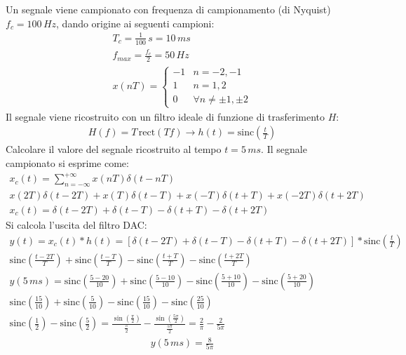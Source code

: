 \documentclass{article}
\newcommand{\rect}{\mathrm{rect}}
\newcommand{\sinc}{\mathrm{sinc}}
\begin{document}
Un segnale viene campionato con frequenza di campionamento (di Nyquist) $f_c=100\,Hz$, dando origine ai seguenti campioni:
\begin{gather*}
    T_c=\displaystyle\frac{1}{100}\,s=10\,ms\\
    f_{max}=\frac{f_c}{2}=50\,Hz\\
    x(nT)=\begin{cases}
        -1&n=-2,-1\\
        1&n=1,2\\
        0&\forall n\neq\pm1,\pm2
    \end{cases}
\end{gather*}
Il segnale viene ricostruito con un filtro ideale di funzione di trasferimento $H$:
\begin{gather*}
    H(f)=T\,\rect(Tf)\to  h(t)=\sinc\left(\frac{t}{T}\right)
\end{gather*} 
Calcolare il valore del segnale ricostruito al tempo $t=5\,ms$. Il segnale campionato si esprime come:
\begin{gather*}
    x_c(t)=\displaystyle\sum_{n=-\infty}^{+\infty}x(nT)\delta(t-nT)\\
    x(2T)\delta(t-2T)+x(T)\delta(t-T)+x(-T)\delta(t+T)+x(-2T)\delta(t+2T)\\
    x_c(t)=\delta(t-2T)+\delta(t-T)-\delta(t+T)-\delta(t+2T)
\end{gather*}
Si calcola l'uscita del filtro DAC:
\begin{gather*}
    y(t)=x_c(t)*h(t)=\left[\delta(t-2T)+\delta(t-T)-\delta(t+T)-\delta(t+2T)\right]*\sinc\left(\displaystyle\frac{t}{T}\right)\\
    \displaystyle\sinc\left(\frac{t-2T}{T}\right)+\sinc\left(\frac{t-T}{T}\right)-\sinc\left(\frac{t+T}{T}\right)-\sinc\left(\frac{t+2T}{T}\right)\\
    y(5\,ms)=\displaystyle\sinc\left(\frac{5-20}{10}\right)+\sinc\left(\frac{5-10}{10}\right)-\sinc\left(\frac{5+10}{10}\right)-\sinc\left(\frac{5+20}{10}\right)\\
    \displaystyle\sinc\left(\frac{15}{10}\right)+\sinc\left(\frac{5}{10}\right)-\sinc\left(\frac{15}{10}\right)-\sinc\left(\frac{25}{10}\right)\\
    \displaystyle\sinc\left(\frac{1}{2}\right)-\sinc\left(\frac{5}{2}\right)=\frac{\sin\left(\frac{\pi}{2}\right)}{\frac{\pi}{2}}-\frac{\sin\left(\frac{5\pi}{2}\right)}{\frac{5\pi}{2}}=\frac{2}{\pi}-\frac{2}{5\pi}
\end{gather*}
\begin{gather}
    y(5\,ms)=\displaystyle\frac{8}{5\pi}
\end{gather}
\end{document}
